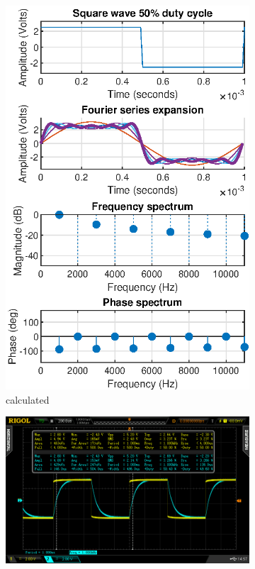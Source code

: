 \documentclass[notitlepage, a4paper, 11pt]{article}
\begin{document}
	\begin{figure}[H]
		\centering
		\begin{subfigure}[][][t]{0.28\textwidth}
			\includegraphics[width=\textwidth]{../Matlab/img/sqr50}
			\caption{calculated}
			\label{fig:calc-signals-b}
		\end{subfigure}
		\quad
		\begin{subfigure}[][][t]{0.28\textwidth}
			\includegraphics[width=\textwidth, trim=85 50 112 45, clip]{../img/osc/DS2_QuickPrint4.png}

\end{subfigure}
\end{figure}
\end{document}
